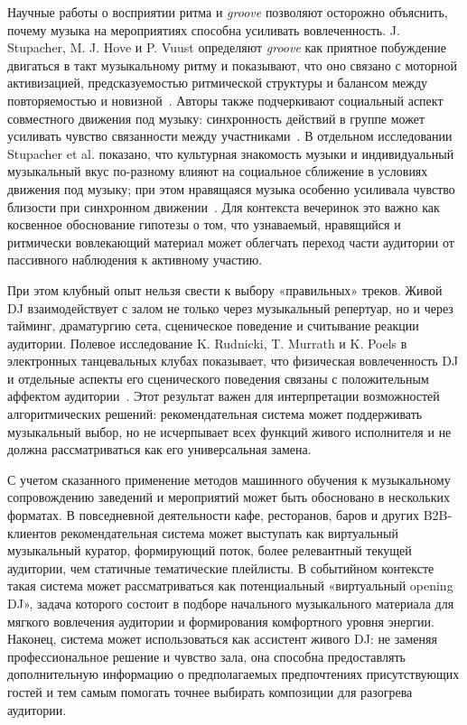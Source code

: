 Научные работы о восприятии ритма и \textit{groove} позволяют осторожно объяснить, почему музыка на мероприятиях способна усиливать вовлеченность. J. Stupacher, M. J. Hove и P. Vuust определяют \textit{groove} как приятное побуждение двигаться в такт музыкальному ритму и показывают, что оно связано с моторной активизацией, предсказуемостью ритмической структуры и балансом между повторяемостью и новизной~\cite{stupacher2023groove}. Авторы также подчеркивают социальный аспект совместного движения под музыку: синхронность действий в группе может усиливать чувство связанности между участниками~\cite{stupacher2023groove}. В отдельном исследовании Stupacher et al. показано, что культурная знакомость музыки и индивидуальный музыкальный вкус по-разному влияют на социальное сближение в условиях движения под музыку; при этом нравящаяся музыка особенно усиливала чувство близости при синхронном движении~\cite{stupacher2020familiarity}. Для контекста вечеринок это важно как косвенное обоснование гипотезы о том, что узнаваемый, нравящийся и ритмически вовлекающий материал может облегчать переход части аудитории от пассивного наблюдения к активному участию.

При этом клубный опыт нельзя свести к выбору «правильных» треков. Живой DJ взаимодействует с залом не только через музыкальный репертуар, но и через тайминг, драматургию сета, сценическое поведение и считывание реакции аудитории. Полевое исследование K. Rudnicki, T. Murrath и K. Poels в электронных танцевальных клубах показывает, что физическая вовлеченность DJ и отдельные аспекты его сценического поведения связаны с положительным аффектом аудитории~\cite{rudnicki2025djs}. Этот результат важен для интерпретации возможностей алгоритмических решений: рекомендательная система может поддерживать музыкальный выбор, но не исчерпывает всех функций живого исполнителя и не должна рассматриваться как его универсальная замена.

С учетом сказанного применение методов машинного обучения к музыкальному сопровождению заведений и мероприятий может быть обосновано в нескольких форматах. В повседневной деятельности кафе, ресторанов, баров и других B2B-клиентов рекомендательная система может выступать как виртуальный музыкальный куратор, формирующий поток, более релевантный текущей аудитории, чем статичные тематические плейлисты. В событийном контексте такая система может рассматриваться как потенциальный «виртуальный opening DJ», задача которого состоит в подборе начального музыкального материала для мягкого вовлечения аудитории и формирования комфортного уровня энергии. Наконец, система может использоваться как ассистент живого DJ: не заменяя профессиональное решение и чувство зала, она способна предоставлять дополнительную информацию о предполагаемых предпочтениях присутствующих гостей и тем самым помогать точнее выбирать композиции для разогрева аудитории.

